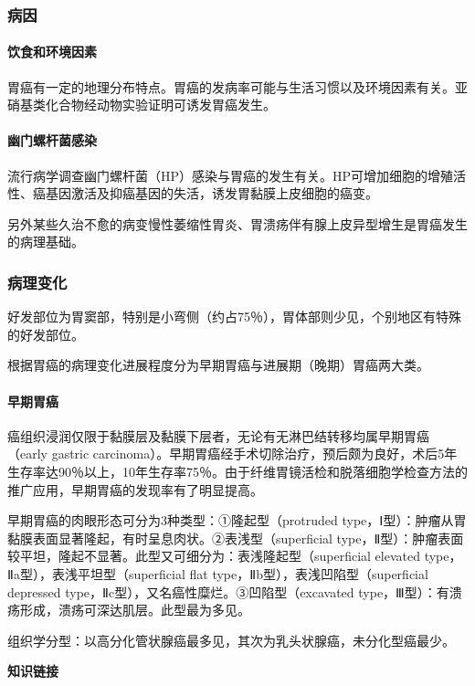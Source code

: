 \subsubsection{病因}

\paragraph{饮食和环境因素}
胃癌有一定的地理分布特点。胃癌的发病率可能与生活习惯以及环境因素有关。亚硝基类化合物经动物实验证明可诱发胃癌发生。

\paragraph{幽门螺杆菌感染}
流行病学调查幽门螺杆菌（HP）感染与胃癌的发生有关。HP可增加细胞的增殖活性、癌基因激活及抑癌基因的失活，诱发胃黏膜上皮细胞的癌变。

另外某些久治不愈的病变慢性萎缩性胃炎、胃溃疡伴有腺上皮异型增生是胃癌发生的病理基础。

\subsubsection{病理变化}

好发部位为胃窦部，特别是小弯侧（约占75％），胃体部则少见，个别地区有特殊的好发部位。

根据胃癌的病理变化进展程度分为早期胃癌与进展期（晚期）胃癌两大类。

\paragraph{早期胃癌}
癌组织浸润仅限于黏膜层及黏膜下层者，无论有无淋巴结转移均属早期胃癌（early
gastric
carcinoma）。早期胃癌经手术切除治疗，预后颇为良好，术后5年生存率达90％以上，10年生存率75％。由于纤维胃镜活检和脱落细胞学检查方法的推广应用，早期胃癌的发现率有了明显提高。

早期胃癌的肉眼形态可分为3种类型：①隆起型（protruded
type，Ⅰ型）：肿瘤从胃黏膜表面显著隆起，有时呈息肉状。②表浅型（superficial
type，Ⅱ型）：肿瘤表面较平坦，隆起不显著。此型又可细分为：表浅隆起型（superficial
elevated type，Ⅱa型），表浅平坦型（superficial flat
type，Ⅱb型），表浅凹陷型（superficial depressed
type，Ⅱc型），又名癌性糜烂。③凹陷型（excavated
type，Ⅲ型）：有溃疡形成，溃疡可深达肌层。此型最为多见。

组织学分型：以高分化管状腺癌最多见，其次为乳头状腺癌，未分化型癌最少。

\begin{center}
    \textbf{知识链接}
\end{center}

